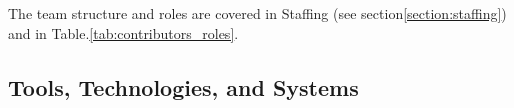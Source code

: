 The team structure and roles are covered in Staffing (see section\:\ref{section:staffing}) and in Table.\:\ref{tab:contributors_roles}.


\begin{comment}
Please note: The roles listed here might have additional responsibilities outlined in the corresponding plans (Documentation Plan, Communication Plan, Testing Plan).

Our team comprises the following roles:

\begin{itemize}
    \item \textbf{Hardware Team Leader:} Manages the hardware development process, coordinates with the software team, and ensures timely delivery while maintaining quality standards.
    \item \textbf{Software Team Leader:} Oversee the software development process, collaborates with the hardware team, and ensure project deadlines are met with high-quality deliverables.
    \item \textbf{Hardware Developer:} Designs, develops, tests, and troubleshoots hardware components and collaborates with the software team.
    \item \textbf{Software Developer:} Develops, tests, and debugs software modules and coordinates with the hardware team.
\end{itemize}
\end{comment}

\subsection{Tools, Technologies, and Systems}
\label{subsection:tools_technologies_and_systems}


